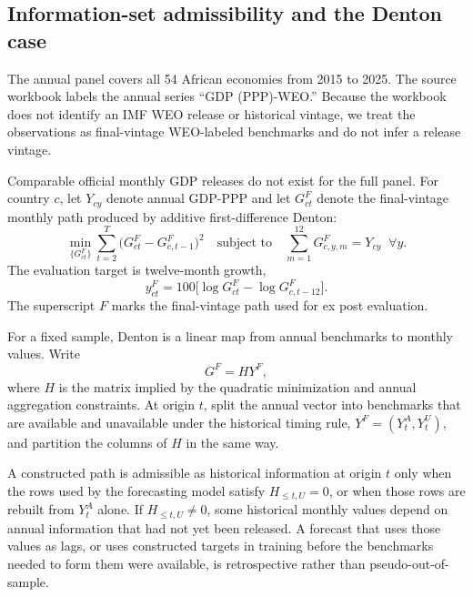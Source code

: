 \documentclass[preprint,12pt,authoryear]{elsarticle}
\begin{document}
\subsection{Information-set admissibility and the Denton case}

The annual panel covers all 54 African economies from 2015 to 2025. The source workbook labels the annual series ``GDP (PPP)-WEO.'' Because the workbook does not identify an IMF WEO release or historical vintage, we treat the observations as final-vintage WEO-labeled benchmarks and do not infer a release vintage.

Comparable official monthly GDP releases do not exist for the full panel. For country $c$, let $Y_{cy}$ denote annual GDP-PPP and let $G^F_{ct}$ denote the final-vintage monthly path produced by additive first-difference Denton:
\begin{equation}
\min_{\{G^F_{ct}\}} \sum_{t=2}^{T} \bigl(G^F_{ct} - G^F_{c,t-1}\bigr)^2
\quad \text{subject to} \quad
\sum_{m=1}^{12} G^F_{c,y,m} = Y_{cy} \;\; \forall y.
\label{eq:denton}
\end{equation}
The evaluation target is twelve-month growth,
\begin{equation}
y^F_{ct} = 100\bigl[\log G^F_{ct} - \log G^F_{c,t-12}\bigr].
\label{eq:gdp12}
\end{equation}
The superscript $F$ marks the final-vintage path used for ex post evaluation.

For a fixed sample, Denton is a linear map from annual benchmarks to monthly values. Write
\begin{equation}
G^F = H Y^F,
\label{eq:linear_operator}
\end{equation}
where $H$ is the matrix implied by the quadratic minimization and annual aggregation constraints. At origin $t$, split the annual vector into benchmarks that are available and unavailable under the historical timing rule, $Y^F=(Y_t^A,Y_t^U)$, and partition the columns of $H$ in the same way.

A constructed path is admissible as historical information at origin $t$ only when the rows used by the forecasting model satisfy $H_{\leq t,U}=0$, or when those rows are rebuilt from $Y_t^A$ alone. If $H_{\leq t,U}\neq0$, some historical monthly values depend on annual information that had not yet been released. A forecast that uses those values as lags, or uses constructed targets in training before the benchmarks needed to form them were available, is retrospective rather than pseudo-out-of-sample.
\end{document}
